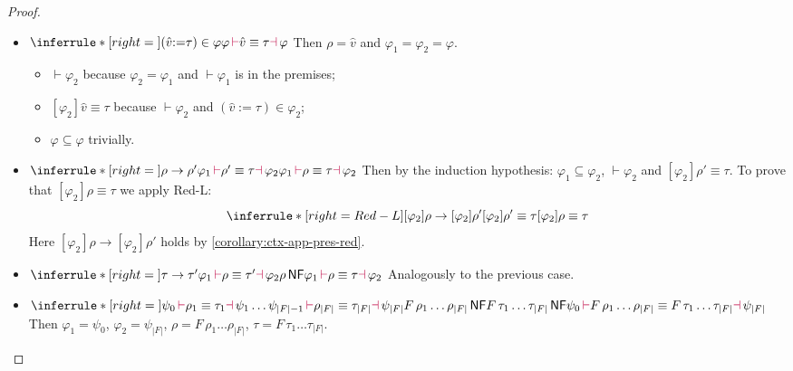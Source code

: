 \documentclass[a4,natbib=false]{article}
\newcommand{\ctxtapp}[2]{[{#1}] {#2}}
\newcommand{\evarassign}[2]{({#1} \mathsf{:=} {#2})}
\newcommand{\reduces}[2]{{#1} \rightarrow {#2}}
\newcommand{\narg}[1]{|{#1}|}
\newcommand{\judgectx}[2]{{#1} \vdash {#2}}
\newcommand{\judgeequivunt}[2]{{#1} \equiv {#2}}
\newcommand{\judgeunify}[4]{{#1}\,{\color{purple}\vdash} {#2} \equiv {#3} {\color{purple}\dashv}\,{#4}}
\newcommand{\judgeSnf}[1]{{#1}\,\mathsf{NF}}
\newcommand{\fullterm}[2]{{#1}\,#2_1 \dots #2_{\narg{#1}}}
\newcommand{\Infer}[3]{\inferrule*[right={#1}]{#2}{#3}}
\begin{document}
\begin{proof}
\begin{itemize}
\begin{itemize}
       
     \end{itemize}
   \item 
      $
      \Infer{}
      { 
        \evarassign{\hat{v}}{\tau} \in \varphi
      }
      {
        \judgeunify{\varphi}{\hat{v}}{\tau}{\varphi}
      }
      $
      Then $\rho = \hat{v}$ and $\varphi_1 = \varphi_2 = \varphi$.
      \begin{itemize}
      \item $\judgectx{}{\varphi_2}$ because $\varphi_2 = \varphi_1$ and
        $\judgectx{}{\varphi_1}$ is in the premises;
      \item $\judgeequivunt{\ctxtapp{\varphi_2}{\hat{v}}}{\tau}$ because
        $\judgectx{}{\varphi_2}$ and $\evarassign{\hat{v}}{\tau} \in \varphi_2$;
      \item $\varphi \subseteq \varphi$ trivially.
      \end{itemize}
    \item
      $
      \Infer{}
      {
        \reduces{\rho}{\rho'}\\
        \judgeunify{\varphi_1}{\rho'}{\tau}{\varphi_2}
      }
      {
        \judgeunify{\varphi_1}{\rho}{\tau}{\varphi_2}
      }
      $
      Then by the induction hypothesis:
      $\varphi_1 \subseteq \varphi_2$,
      $\judgectx{}{\varphi_2}$ and $\judgeequivunt{\ctxtapp{\varphi_2}{\rho'}}{\tau}$.
      To prove that $\judgeequivunt{\ctxtapp{\varphi_2}{\rho}}{\tau}$ we apply Red-L:
      $$
      \Infer{Red-L}
      {
        \reduces{\ctxtapp{\varphi_2}{\rho}}{\ctxtapp{\varphi_2}{\rho'}}\\
        \judgeequivunt{\ctxtapp{\varphi_2}{\rho'}}{\tau}
      }
      {
        \judgeequivunt{\ctxtapp{\varphi_2}{\rho}}{\tau}
      }
      $$
      Here $\reduces{\ctxtapp{\varphi_2}{\rho}}{\ctxtapp{\varphi_2}{\rho'}}$
      holds by \cref{corollary:ctx-app-pres-red}.
    \item
      $
      \Infer{}
      {
        \reduces{\tau}{\tau'}\\
        \judgeunify{\varphi_1}{\rho}{\tau'}{\varphi_2}\\
        \judgeSnf{\rho}
      }
      {
        \judgeunify{\varphi_1}{\rho}{\tau}{\varphi_2}
      }
      $
      Analogously to the previous case.

    \item
      $
      \Infer{}
      {
        \judgeunify{\psi_0}{\rho_1}{\tau_1}{\psi_1} \\
        \dots\\
        \judgeunify{\psi_{\narg{F}-1}}{\rho_{\narg{F}}}{\tau_{\narg{F}}}{\psi_{\narg{F}}} \\
        \judgeSnf{\fullterm{F}{\rho}} \\
        \judgeSnf{\fullterm{F}{\tau}}
      }
      {
        \judgeunify{\psi_0}{\fullterm{F}{\rho}}{\fullterm{F}{\tau}}{\psi_{\narg{F}}}
      }
      $
      Then $\varphi_1 = \psi_0$, $\varphi_2 = \psi_{\narg{F}}$, $\rho =
      \fullterm{F}{\rho}$, $\tau = \fullterm{F}{\tau}$. 


\end{itemize}
\end{proof}
\end{document}
